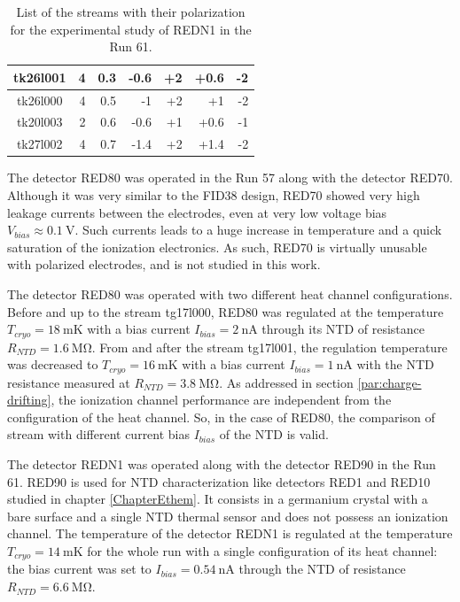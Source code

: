 \begin{table}[]
\begin{tabular}{c|rrrrrr}
tk26l001  & 4                  & 0.3                  & -0.6                  & +2                  & +0.6                  & -2                  \\ \hline
tk26l000  & 4                  & 0.5                  & -1                    & +2                  & +1                    & -2                  \\ \hline
tk20l003  & 2                  & 0.6                  & -0.6                  & +1                  & +0.6                  & -1                  \\ \hline
tk27l002  & 4                  & 0.7                  & -1.4                  & +2                  & +1.4                  & -2                 
\end{tabular}%
\caption{List of the streams with their polarization for the experimental study of REDN1 in the Run 61.}
\label{tab:redn1-stream-list}
\end{table}

The detector RED80 was operated in the Run 57 along with the detector RED70. Although it was very similar to the FID38 design, RED70 showed very high leakage currents between the electrodes, even at very low voltage bias $V_{bias} \approx \SI{0.1}{\volt}$. Such currents leads to a huge increase in temperature and a quick saturation of the ionization electronics. As such, RED70 is virtually unusable with polarized electrodes, and is not studied in this work.

The detector RED80 was operated with two different heat channel configurations. Before and up to the stream tg17l000, RED80 was regulated at the temperature $T_{cryo}=\SI{18}{\milli\kelvin}$ with a bias current $I_{bias} = \SI{2}{\nano\ampere}$ through its NTD of resistance $R_{NTD}=\SI{1.6}{\mega\ohm}$. From and after the stream tg17l001, the regulation temperature was decreased to $T_{cryo}=\SI{16}{\milli\kelvin}$ with a bias current $I_{bias} = \SI{1}{\nano\ampere}$ with the NTD resistance measured at $R_{NTD}=\SI{3.8}{\mega\ohm}$.
As addressed in section \ref{par:charge-drifting}, the ionization channel performance are independent from the configuration of the heat channel. So, in the case of RED80, the comparison of stream with different current bias $I_{bias}$ of the NTD is valid.

The detector REDN1 was operated along with the detector RED90 in the Run 61. RED90 is used for NTD characterization like detectors RED1 and RED10 studied in chapter \ref{ChapterEthem}. It consists in a germanium crystal with a bare surface and a single NTD thermal sensor and does not possess an ionization channel.
The temperature of the detector REDN1 is regulated at the temperature $T_{cryo}=\SI{14}{\milli\kelvin}$ for the whole run with a single configuration of its heat channel: the bias current was set to $I_{bias}=\SI{0.54}{\nano\ampere}$ through the NTD of resistance $R_{NTD} = \SI{6.6}{\mega\ohm}$.


